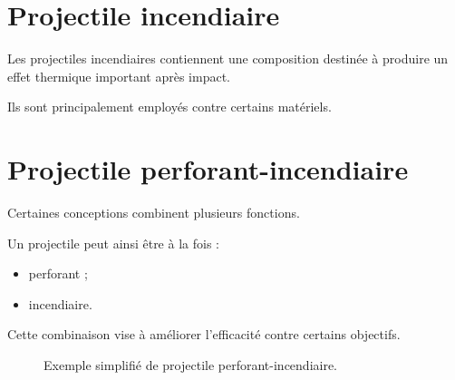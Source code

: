 \section{Projectile incendiaire}

Les projectiles incendiaires contiennent une composition destinée à produire
un effet thermique important après impact.

Ils sont principalement employés contre certains matériels.

\section{Projectile perforant-incendiaire}

Certaines conceptions combinent plusieurs fonctions.

Un projectile peut ainsi être à la fois :

\begin{itemize}
    \item perforant ;
    \item incendiaire.
\end{itemize}

Cette combinaison vise à améliorer l'efficacité contre certains objectifs.

\begin{figure}[htbp]
\centering


\caption{Exemple simplifié de projectile perforant-incendiaire.}
\label{fig:perforant_incendiaire}

\end{figure}

